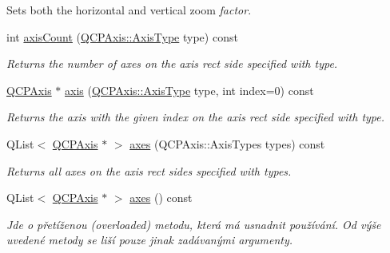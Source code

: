 \begin{DoxyCompactItemize}
\begin{DoxyCompactList}
Sets both the horizontal and vertical zoom {\itshape factor}. \end{DoxyCompactList}\item 
int \hyperlink{classQCPAxisRect_a16e3e4646e52e4b5d5b865076c29ae58}{axis\+Count} (\hyperlink{classQCPAxis_ae2bcc1728b382f10f064612b368bc18a}{Q\+C\+P\+Axis\+::\+Axis\+Type} type) const 
\begin{DoxyCompactList}\small\item\em Returns the number of axes on the axis rect side specified with {\itshape type}. \end{DoxyCompactList}\item 
\hyperlink{classQCPAxis}{Q\+C\+P\+Axis} $\ast$ \hyperlink{classQCPAxisRect_a560de44e47a4af0f86c59102a094b1e4}{axis} (\hyperlink{classQCPAxis_ae2bcc1728b382f10f064612b368bc18a}{Q\+C\+P\+Axis\+::\+Axis\+Type} type, int index=0) const 
\begin{DoxyCompactList}\small\item\em Returns the axis with the given {\itshape index} on the axis rect side specified with {\itshape type}. \end{DoxyCompactList}\item 
Q\+List$<$ \hyperlink{classQCPAxis}{Q\+C\+P\+Axis} $\ast$ $>$ \hyperlink{classQCPAxisRect_a66654d51ca611ef036ded36250cd2518}{axes} (Q\+C\+P\+Axis\+::\+Axis\+Types types) const 
\begin{DoxyCompactList}\small\item\em Returns all axes on the axis rect sides specified with {\itshape types}. \end{DoxyCompactList}\item 
\hypertarget{classQCPAxisRect_a18dcdc0dd6c7520bc9f3d15a7a3feec2}{}Q\+List$<$ \hyperlink{classQCPAxis}{Q\+C\+P\+Axis} $\ast$ $>$ \hyperlink{classQCPAxisRect_a18dcdc0dd6c7520bc9f3d15a7a3feec2}{axes} () const \label{classQCPAxisRect_a18dcdc0dd6c7520bc9f3d15a7a3feec2}

\begin{DoxyCompactList}\small\item\em Jde o přetíženou (overloaded) metodu, která má usnadnit používání. Od výše uvedené metody se liší pouze jinak zadávanými argumenty.


\end{DoxyCompactList}
\end{DoxyCompactItemize}
